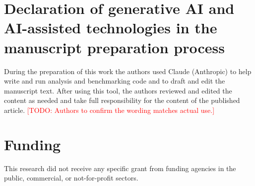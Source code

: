 \documentclass[a4paper,fleqn]{cas-sc}
\newcommand{\todo}[1]{\textcolor{red}{[TODO: #1]}}
\begin{document}
\section*{Declaration of generative AI and AI-assisted technologies in the manuscript preparation process}
During the preparation of this work the authors used Claude (Anthropic) to
help write and run analysis and benchmarking code and to draft and edit
the manuscript text. After using this tool, the authors reviewed and edited
the content as needed and take full responsibility for the content of the
published article. \todo{Authors to confirm the wording matches actual use.}

\section*{Funding}
This research did not receive any specific grant from funding agencies in
the public, commercial, or not-for-profit sectors.



\end{document}
